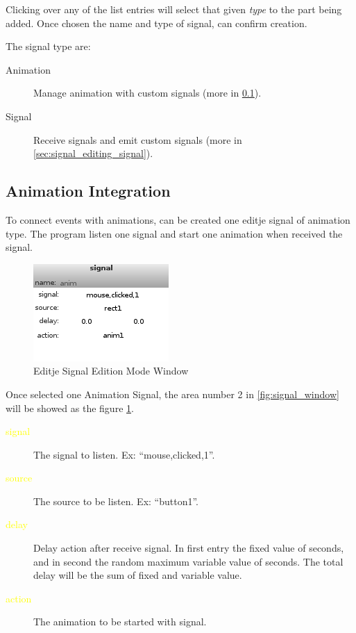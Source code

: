 \documentclass[a4paper]{profusion}
\newcommand{\GUIEditable}[1]{\textcolor{yellow}{#1}} %
\begin{document}
Clicking over any of the list entries will select that given
\emph{type} to the part being added. Once chosen the name and type of
signal, can confirm creation.

The signal type are:
\begin{description}
 \item[Animation] Manage animation with custom signals (more in
   \ref{sec:signal_editing_animation}).
 \item[Signal] Receive signals and emit custom signals (more in
   \ref{sec:signal_editing_signal}).
\end{description}

\subsection{Animation Integration}
\label{sec:signal_editing_animation}

To connect events with animations, can be created one editje signal of
animation type. The program listen one signal and start one animation
when received the signal.

\begin{figure}
 \centering
 \includegraphics{./images/signal_anim.png}
 \caption{Editje Signal Edition Mode Window}
 \label{fig:signal_animation_config}
\end{figure}

Once selected one Animation Signal, the area number 2 in
\ref{fig:signal_window} will be showed as the figure
\ref{fig:signal_animation_config}.

\begin{description}
 \item[\GUIEditable{signal}] The signal to listen. Ex:
   ``mouse,clicked,1''.
 \item[\GUIEditable{source}] The source to be listen. Ex: ``button1''.
 \item[\GUIEditable{delay}] Delay action after receive signal. In
   first entry the fixed value of seconds, and in second the random
   maximum variable value of seconds.  The total delay will be the sum
   of fixed and variable value.
 \item[\GUIEditable{action}] The animation to be started with signal.
\end{description}
\end{document}
